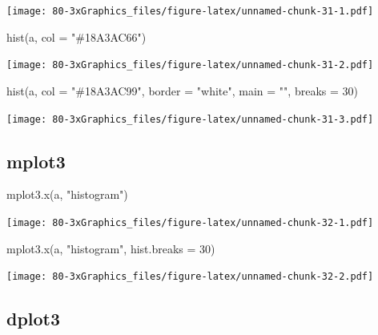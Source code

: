 \documentclass[
]{book}
\newenvironment{Shaded}{\begin{snugshade}}{\end{snugshade}}
\newcommand{\AttributeTok}[1]{\textcolor[rgb]{0.77,0.63,0.00}{#1}}
\newcommand{\DecValTok}[1]{\textcolor[rgb]{0.00,0.00,0.81}{#1}}
\newcommand{\FunctionTok}[1]{\textcolor[rgb]{0.00,0.00,0.00}{#1}}
\newcommand{\NormalTok}[1]{#1}
\newcommand{\StringTok}[1]{\textcolor[rgb]{0.31,0.60,0.02}{#1}}
\begin{document}
\texttt{[image: 80-3xGraphics\_files/figure-latex/unnamed-chunk-31-1.pdf]}

\begin{Shaded}
\begin{Highlighting}[]
\FunctionTok{hist}\NormalTok{(a, }\AttributeTok{col =} \StringTok{"\#18A3AC66"}\NormalTok{)}
\end{Highlighting}
\end{Shaded}

\texttt{[image: 80-3xGraphics\_files/figure-latex/unnamed-chunk-31-2.pdf]}

\begin{Shaded}
\begin{Highlighting}[]
\FunctionTok{hist}\NormalTok{(a, }\AttributeTok{col =} \StringTok{"\#18A3AC99"}\NormalTok{, }\AttributeTok{border =} \StringTok{"white"}\NormalTok{, }\AttributeTok{main =} \StringTok{""}\NormalTok{, }\AttributeTok{breaks =} \DecValTok{30}\NormalTok{)}
\end{Highlighting}
\end{Shaded}

\texttt{[image: 80-3xGraphics\_files/figure-latex/unnamed-chunk-31-3.pdf]}

\hypertarget{mplot3-3}{%
\subsection{\texorpdfstring{\textbf{mplot3}}{mplot3}}\label{mplot3-3}}

\begin{Shaded}
\begin{Highlighting}[]
\FunctionTok{mplot3.x}\NormalTok{(a, }\StringTok{"histogram"}\NormalTok{)}
\end{Highlighting}
\end{Shaded}

\texttt{[image: 80-3xGraphics\_files/figure-latex/unnamed-chunk-32-1.pdf]}

\begin{Shaded}
\begin{Highlighting}[]
\FunctionTok{mplot3.x}\NormalTok{(a, }\StringTok{"histogram"}\NormalTok{, }\AttributeTok{hist.breaks =} \DecValTok{30}\NormalTok{)}
\end{Highlighting}
\end{Shaded}

\texttt{[image: 80-3xGraphics\_files/figure-latex/unnamed-chunk-32-2.pdf]}

\hypertarget{dplot3-3}{%
\subsection{\texorpdfstring{\textbf{dplot3}}{dplot3}}\label{dplot3-3}}
\end{document}
